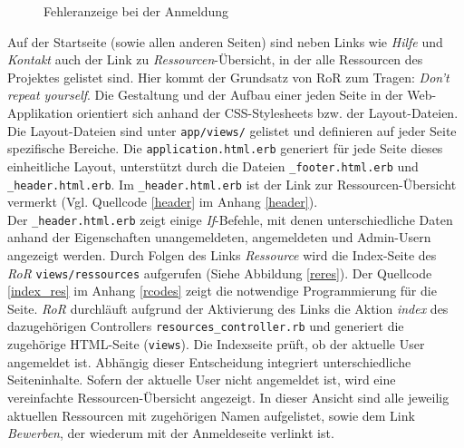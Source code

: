 \documentclass[a4paper,12pt,parskip,bibtotoc,liststotoc]{article}
\begin{document}
\begin{figure}[h!]
  \begin{center}
    \caption{Fehleranzeige bei der Anmeldung}  \label{Fehler}
  \end{center}
\end{figure}

Auf der Startseite (sowie allen anderen Seiten) sind neben Links wie \textit{Hilfe} und \textit{Kontakt} auch der Link zu \textit{Ressourcen}-Übersicht, in der alle Ressourcen des Projektes gelistet sind. Hier kommt der Grundsatz von RoR zum Tragen: \textit{Don’t repeat yourself}. Die Gestaltung und der Aufbau einer jeden Seite in der Web-Applikation orientiert sich anhand der CSS-Stylesheets bzw. der Layout-Dateien. Die Layout-Dateien sind unter \texttt{app/views/} gelistet und definieren auf jeder Seite spezifische Bereiche. Die \texttt{application.html.erb} generiert für jede Seite dieses einheitliche Layout, unterstützt durch die Dateien \texttt{\_footer.html.erb} und \texttt{\_header.html.erb}. Im \texttt{\_header.html.erb} ist der Link zur Ressourcen-Übersicht vermerkt (Vgl. Quellcode \ref{header} im Anhang \ref{header}).\\

Der \texttt{\_header.html.erb} zeigt einige \textit{If}-Befehle, mit denen unterschiedliche Daten anhand der Eigenschaften unangemeldeten, angemeldeten und Admin-Usern angezeigt werden. Durch Folgen des Links \textit{Ressource} wird die Index-Seite des \textit{RoR} \texttt{views/ressources} aufgerufen (Siehe Abbildung \ref{reres}). Der Quellcode \ref{index_res} im Anhang \ref{rcodes} zeigt die notwendige Programmierung für die Seite. \textit{RoR} durchläuft aufgrund der Aktivierung des Links die Aktion \textit{index} des dazugehörigen Controllers \texttt{resources\_controller.rb} und generiert die zugehörige HTML-Seite (\texttt{views}). Die Indexseite prüft, ob der aktuelle User angemeldet ist. Abhängig dieser Entscheidung integriert  unterschiedliche Seiteninhalte. Sofern der aktuelle User nicht angemeldet ist, wird eine vereinfachte Ressourcen-Übersicht angezeigt. In dieser Ansicht sind alle jeweilig aktuellen Ressourcen mit zugehörigen Namen aufgelistet, sowie dem Link \textit{Bewerben}, der wiederum mit der Anmeldeseite verlinkt ist.\\
\end{document}
